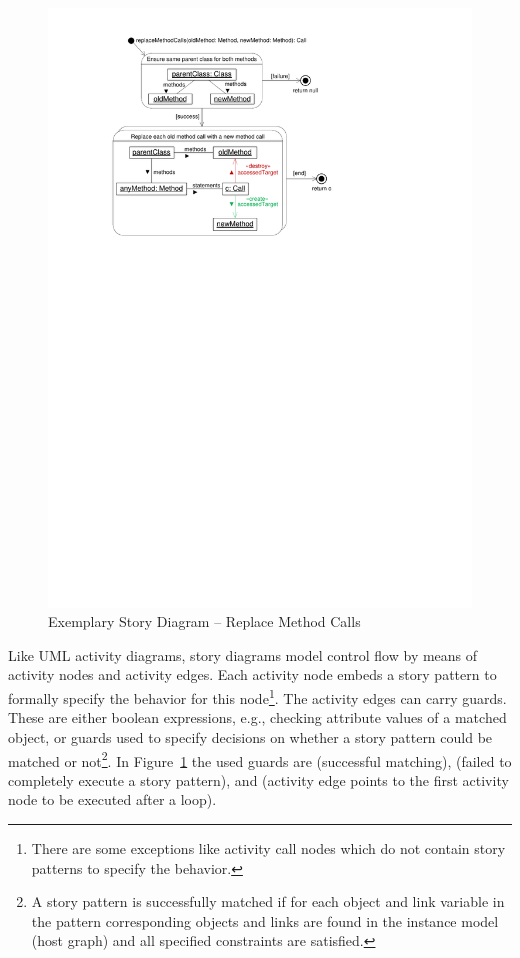 \begin{figure}[htb]
  \centering
  \includegraphics[scale=1.0]{figures/SimpleStoryDiagramExample}
  \caption{Exemplary Story Diagram -- Replace Method Calls}
  \label{fig:simpleStoryDiagram}
\end{figure}

Like UML activity diagrams, story diagrams model control flow by means of activity nodes and activity edges.
Each activity node embeds a story pattern to formally specify the behavior for this node\footnote{There are
some exceptions like activity call nodes which do not contain story patterns to specify the behavior.}.
The activity edges can carry guards.
These are either boolean expressions, e.g., checking attribute values of a matched object,
or guards used to specify decisions on whether a story pattern could be
matched or not\footnote{A story pattern is successfully matched if for each object and link variable in the pattern corresponding objects and links are found in the instance model (host graph) and all specified constraints are satisfied.}.
In Figure~\ref{fig:simpleStoryDiagram} the used guards are  (successful matching),
 (failed to completely execute a story pattern),
and  (activity edge points to the first activity node to be executed after a loop).

